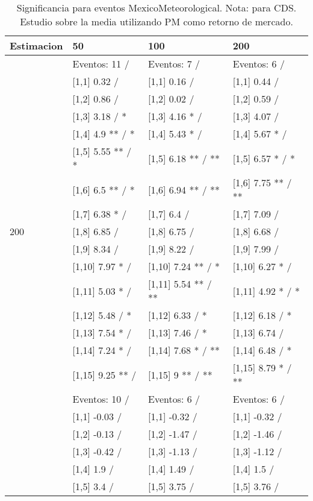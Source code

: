 \begin{table}

\caption{Significancia para eventos MexicoMeteorological. Nota: para CDS. Estudio sobre la media utilizando PM como retorno de mercado.}
\centering
\begin{tabular}[t]{llll}
\toprule
Estimacion & 50 & 100 & 200\\
\midrule
 & Eventos:  11 / & Eventos:  7 / & Eventos:  6 /\\
 & {}[1,1] 0.32  / & {}[1,1] 0.16  / & {}[1,1] 0.44  /\\
 & {}[1,2] 0.86  / & {}[1,2] 0.02  / & {}[1,2] 0.59  /\\
 & {}[1,3] 3.18  / * & {}[1,3] 4.16 * / & {}[1,3] 4.07  /\\
 & {}[1,4] 4.9 ** / * & {}[1,4] 5.43 * / & {}[1,4] 5.67 * /\\
\addlinespace
 & {}[1,5] 5.55 ** / * & {}[1,5] 6.18 ** / ** & {}[1,5] 6.57 * / *\\
 & {}[1,6] 6.5 ** / * & {}[1,6] 6.94 ** / ** & {}[1,6] 7.75 ** / **\\
 & {}[1,7] 6.38 * / & {}[1,7] 6.4  / & {}[1,7] 7.09  /\\
200 & {}[1,8] 6.85  / & {}[1,8] 6.75  / & {}[1,8] 6.68  /\\
 & {}[1,9] 8.34  / & {}[1,9] 8.22  / & {}[1,9] 7.99  /\\
\addlinespace
 & {}[1,10] 7.97 * / & {}[1,10] 7.24 ** / * & {}[1,10] 6.27 * /\\
 & {}[1,11] 5.03 * / & {}[1,11] 5.54 ** / ** & {}[1,11] 4.92 * / *\\
 & {}[1,12] 5.48  / * & {}[1,12] 6.33  / * & {}[1,12] 6.18  / *\\
 & {}[1,13] 7.54 * / & {}[1,13] 7.46  / * & {}[1,13] 6.74  /\\
 & {}[1,14] 7.24 * / & {}[1,14] 7.68 * / ** & {}[1,14] 6.48  / *\\
\addlinespace
 & {}[1,15] 9.25 ** / & {}[1,15] 9 ** / ** & {}[1,15] 8.79 * / **\\
 & Eventos:  10 / & Eventos:  6 / & Eventos:  6 /\\
 & {}[1,1] -0.03  / & {}[1,1] -0.32  / & {}[1,1] -0.32  /\\
 & {}[1,2] -0.13  / & {}[1,2] -1.47  / & {}[1,2] -1.46  /\\
 & {}[1,3] -0.42  / & {}[1,3] -1.13  / & {}[1,3] -1.12  /\\
\addlinespace
 & {}[1,4] 1.9  / & {}[1,4] 1.49  / & {}[1,4] 1.5  /\\
 & {}[1,5] 3.4  / & {}[1,5] 3.75  / & {}[1,5] 3.76  /\\

\end{tabular}
\end{table}
